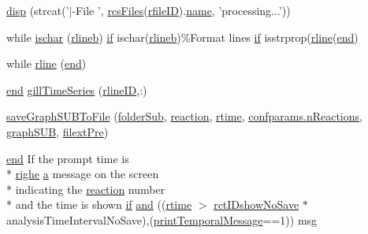 \begin{DoxyCompactItemize}
\hyperlink{a00028_a4fe58a51590fa7bdca1837a88383dac0}{disp} (strcat('$\vert$-\/File ', \hyperlink{a00028_aa7a414dad4901fc05688608a49adfd7e}{rcs\+Files}(\hyperlink{a00028_a2773ef160060ce8adead229154219112}{rfile\+I\+D}).\hyperlink{a00027_abbf559a76fab59203496b0847ab9502a}{name}, 'processing...'))
\item 
while \hyperlink{a00028_aaa2ace52a161710427bdc25dd600089b}{ischar} (\hyperlink{a00028_a8df79027fd85d4a3668754f36e9e88c1}{rlineb}) \hyperlink{a00030_a01d55766b8058903dd360b4bda71f9f5}{if} ischar(\hyperlink{a00028_a8df79027fd85d4a3668754f36e9e88c1}{rlineb})\%Format lines \hyperlink{a00030_a01d55766b8058903dd360b4bda71f9f5}{if} isstrprop(\hyperlink{a00028_ab5b947e1a8b7cf496ffd4eb21317052e}{rline}(\hyperlink{a00025_afb358f48b1646c750fb9da6c6585be2b}{end})
\item 
while \hyperlink{a00028_ab5b947e1a8b7cf496ffd4eb21317052e}{rline} (\hyperlink{a00025_afb358f48b1646c750fb9da6c6585be2b}{end})
\item 
\hyperlink{a00025_afb358f48b1646c750fb9da6c6585be2b}{end} \hyperlink{a00028_ac62d9b6e4b7257c90322e20e1eb8e733}{gill\+Time\+Series} (\hyperlink{a00028_a8443a49765859a8631fed7e8a1d27fe5}{rline\+I\+D},\+:)
\item 
\hyperlink{a00028_af8c5bdc8ca3fe8ddcc8594ecad80560a}{save\+Graph\+S\+U\+B\+To\+File} (\hyperlink{a00028_a05c5bf0305e5d58d4dc25bd89a025678}{folder\+Sub}, \hyperlink{a00028_a4ba2ecb46f808729569ecce2cc1d34c6}{reaction}, \hyperlink{a00028_afc6b38657a313b9f1de2ee356910b6ee}{rtime}, \hyperlink{a00113_a8d704532b4b419f1428cb078bb5c7ffe}{confparams.\+n\+Reactions}, \hyperlink{a00028_acd499d32ebba9c935bab9a19da7a174b}{graph\+S\+U\+B}, \hyperlink{a00028_a527736a425f4f7ead2c2dc9d7b479346}{filext\+Pre})
\item 
\hyperlink{a00025_afb358f48b1646c750fb9da6c6585be2b}{end} If the prompt time is \\*
\hyperlink{a00108_abdf49e297e2c121f2d09f075ac3d518a}{righe} \hyperlink{a00035_a2ffdbad9ea59541e59cbd2b938e0770c}{a} message on the screen \\*
indicating the \hyperlink{a00028_a4ba2ecb46f808729569ecce2cc1d34c6}{reaction} number \\*
and the time is shown \hyperlink{a00030_a01d55766b8058903dd360b4bda71f9f5}{if} \hyperlink{a00028_a170f8acb213f91bf71c77b1d20bceb33}{and} ((\hyperlink{a00028_afc6b38657a313b9f1de2ee356910b6ee}{rtime} $>$ \hyperlink{a00028_aeb449dcc9eb8bfe0321b031e10962ac5}{rct\+I\+Dshow\+No\+Save} $\ast$analysis\+Time\+Interval\+No\+Save),(\hyperlink{a00028_acc16e80f122cc11cf1570c53597afb19}{print\+Temporal\+Message}==1)) msg

\end{DoxyCompactItemize}
